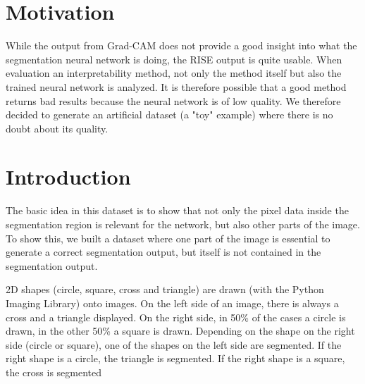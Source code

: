 \section{Motivation}
While the output from Grad-CAM does not provide a good insight into what the segmentation neural network is doing, the RISE output is quite usable. When evaluation an interpretability method, not only the method itself but also the trained neural network is analyzed. It is therefore possible that a good method returns bad results because the neural network is of low quality. We therefore decided to generate an artificial dataset (a "toy" example) where there is no doubt about its quality.


\section{Introduction}

The basic idea in this dataset is to show that not only the pixel data inside the segmentation region is relevant for the network, but also other parts of the image. To show this, we built a dataset where one part of the image is essential to generate a correct segmentation output, but itself is not contained in the segmentation output.

2D shapes (circle, square, cross and triangle) are drawn (with the Python Imaging Library) onto images. On the left side of an image, there is always a cross and a triangle displayed. On the right side, in 50\% of the cases a circle is drawn, in the other 50\% a square is drawn. Depending on the shape on the right side (circle or square), one of the shapes on the left side are segmented. If the right shape is a circle, the triangle is segmented. If the right shape is a square, the cross is segmented

